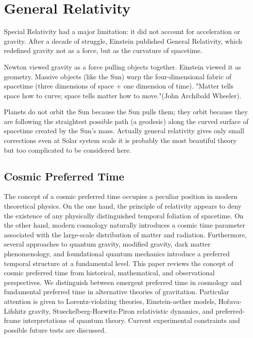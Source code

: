 \chapter{General Relativity}
\label{ch:gr}
Special Relativity had a major limitation: it did not account 
for acceleration or gravity. After a decade of struggle, 
Einstein published General Relativity, which redefined 
gravity not as a force, but as the curvature of spacetime.

Newton viewed gravity as a force pulling objects together. 
Einstein viewed it as geometry. Massive objects (like the Sun) 
warp the four-dimensional fabric of spacetime 
(three dimensions of space + one dimension of time).
"Matter tells space how to curve; space tells matter how to move."(John Archibald Wheeler).

Planets do not orbit the Sun because the Sun pulls them; 
they orbit because they are following the straightest possible path 
(a geodesic) along the curved surface of spacetime created by the Sun's mass.
Actually general relativity gives only small corrections even 
at Solar system scale it is probably the most beautiful theory but too
complicated to be considered here. 

\section{Cosmic Preferred Time}
\label{crt:cpt}

The concept of a cosmic preferred time occupies a peculiar position in
modern theoretical physics. On the one hand, the principle of relativity
appears to deny the existence of any physically distinguished temporal
foliation of spacetime. On the other hand, modern cosmology naturally
introduces a cosmic time parameter associated with the large-scale
distribution of matter and radiation. Furthermore, several approaches to
quantum gravity, modified gravity, dark matter phenomenology, and
foundational quantum mechanics introduce a preferred temporal structure at
a fundamental level. This paper reviews the concept of cosmic preferred
time from historical, mathematical, and observational perspectives. We
distinguish between emergent preferred time in cosmology and fundamental
preferred time in alternative theories of gravitation. Particular attention
is given to Lorentz-violating theories, Einstein-aether models,
Hořava-Lifshitz gravity, Stueckelberg-Horwitz-Piron relativistic dynamics,
and preferred-frame interpretations of quantum theory. Current experimental
constraints and possible future tests are discussed.

